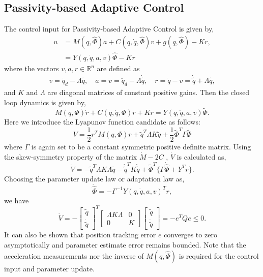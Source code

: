 \documentclass[letterpaper, 10 pt, conference]{ieeeconf}  %
\begin{document}
\subsection{Passivity-based Adaptive Control \cite{Slotine_AdaptiveControl}}
The control input for Passivity-based Adaptive Control is given by,
\begin{align}
u & = M(q,\hat{\Phi})a + C(q,\dot{q},\hat{\Phi})v + g(q,\hat{\Phi})-Kr, \label{PBAC_input}\\
& = Y(q,\dot{q}, a, v)\hat{\Phi} - Kr \nonumber
\end{align}
where the vectors $v,a,r\in\mathbb{R}^{n}$ are defined as
\begin{align*}
v = \dot{q}_{d}-\Lambda\tilde{q}, \quad
a = \dot{v} = \ddot{q}_{d}-\Lambda\dot{\tilde{q}}, \quad
r = \dot{q}-v = \dot{\tilde{q}}+\Lambda\tilde{q},
\end{align*}
and $K$ and $\Lambda$ are diagonal matrices of constant positive gains. Then the closed loop dynamics is given by,
\begin{equation*}
M(q,\Phi)\dot{r} + C(q,\dot{q},\Phi)r+Kr = Y(q,\dot{q},a,v)\tilde{\Phi}.
\end{equation*}
Here we introduce the Lyapunov function candidate as follows:
\begin{equation}
V = \frac{1}{2}r^{T}M(q,\Phi)r + \tilde{q}^{T}\Lambda K\tilde{q}+\frac{1}{2}\tilde{\Phi}^{T}\Gamma\tilde{\Phi} \label{Slotine_lyapunov}
\end{equation}
where $\Gamma$ is again set to be a constant symmetric positive definite matrix.
Using the skew-symmetry property of the matrix $\dot{M} - 2C$ \cite{Slotine_AdaptiveControl}, $\dot{V}$ is calculated as,
\begin{equation*}
\dot{V} = -\tilde{q}^{T}\Lambda K \Lambda\tilde{q} - \dot{\tilde{q}}^{T}K\dot{\tilde{q}} + \tilde{\Phi}^{T}\{\Gamma\dot{\hat{\Phi}} + Y^{T}r\}.
\end{equation*}
Choosing the parameter update law or adaptation law as,
\begin{equation}
\dot{\hat{\Phi}} = -\Gamma^{-1}Y(q,\dot{q},a,v)^{T}r, \label{PBAC_parameter_update}
\end{equation}
we have
\begin{equation*}
\dot{V} = -\left[\begin{array}{c} \tilde{q} \\ \dot{\tilde{q}}\end{array}\right]^{T}\left[\begin{array}{cc} \Lambda K \Lambda & 0 \\ 0 & K \end{array}\right]\left[\begin{array}{c} \tilde{q} \\ \dot{\tilde{q}}\end{array}\right] = -e^{T}Qe \leq 0.
\end{equation*}
It can also be shown that position tracking error $e$ converges to zero asymptotically and parameter estimate error remains bounded. Note that the acceleration measurements nor the inverse of $M(q,\hat{\Phi})$ is required for the control input and parameter update.
\end{document}
